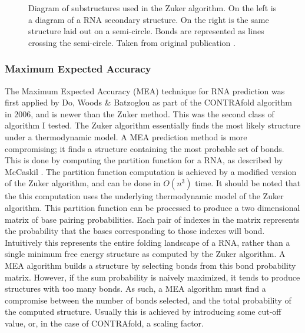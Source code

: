 \documentclass[12pt, a4paper]{article}
\begin{document}
\begin{figure}
\begin{center}
\end{center}
\caption{Diagram of substructures used in the Zuker algorithm. On the left is a diagram of a RNA secondary structure. On the right is the same structure laid out on a semi-circle. Bonds are represented as lines crossing the semi-circle. Taken from original
publication \cite{zuker1981optimal}.}
\label{fig:zuk_struct}
\end{figure}

\subsubsection{Maximum Expected Accuracy}
The Maximum Expected Accuracy (MEA) technique for RNA prediction was first applied by Do, Woods \& Batzoglou as part of the CONTRAfold algorithm \cite{do2006contrafold} in 2006, and is newer than the Zuker method. This was the second class of algorithm I tested. The Zuker algorithm essentially finds the most likely structure under a thermodynamic model. A MEA prediction method is more compromising; it finds a structure containing the most probable set of bonds. This is done by computing the partition function for a RNA, as described by McCaskil \cite{mccaskill1990equilibrium}. The partition function computation is achieved by a modified version of the Zuker algorithm, and can be done in $O(n^3)$ time. It should be noted that the this computation uses the underlying thermodynamic model of the Zuker algorithm. This partition function can be processed to produce a two dimensional matrix of base pairing probabilities. Each pair of indexes in the matrix represents the probability that the bases corresponding to those indexes will bond. Intuitively this represents the entire folding landscape of a RNA, rather than a single minimum free energy structure as computed by the Zuker algorithm. A MEA algorithm builds a structure by selecting bonds from this bond probability matrix. However, if the sum probability is naively maximized, it tends to produce structures with too many bonds. As such, a MEA algorithm must find a compromise between the number of bonds selected, and the total probability of the computed structure. Usually this is achieved by introducing some cut-off value, or, in the case of CONTRAfold, a scaling factor.
\end{document}
